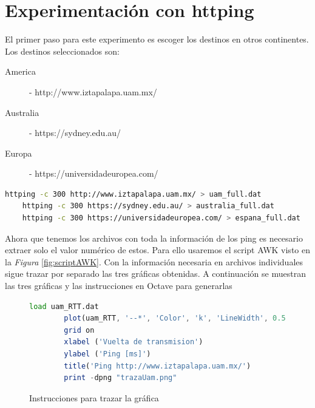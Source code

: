 \section*{Experimentación con httping}

\noindent El primer paso para este experimento es escoger los destinos en otros continentes. Los destinos seleccionados son:

\begin{description}
    \item[America] - http://www.iztapalapa.uam.mx/
	\item[Australia] - https://sydney.edu.au/
	\item[Europa] - https://universidadeuropea.com/
\end{description}

\begin{lstlisting}[language=Bash, caption=Pings con 300 muestras guardando la salida, label=lst:pings]
	httping -c 300 http://www.iztapalapa.uam.mx/ > uam_full.dat
	httping -c 300 https://sydney.edu.au/ > australia_full.dat
	httping -c 300 https://universidadeuropea.com/ > espana_full.dat
\end{lstlisting}

\noindent Ahora que tenemos los archivos con toda la informaci\'on de los ping es necesario extraer solo el valor num\'erico de estos. Para ello usaremos el script AWK visto en la \emph{Figura }\ref{fig:scriptAWK}. Con la informaci\'on necesaria en archivos individuales sigue trazar por separado las tres gr\'aficas obtenidas. A continuaci\'on se muestran las tres gr\'aficas y las instrucciones en Octave para generarlas

\newpage

\begin{figure}[H] 
    \centering 
    \begin{lstlisting}[frame=single, breaklines=true, basicstyle=\footnotesize\ttfamily, breakatwhitespace=false, columns=flexible, tabsize=2, showstringspaces=false, language=Octave] 
        load uam_RTT.dat 
        plot(uam_RTT, '--*', 'Color', 'k', 'LineWidth', 0.5, 'MarkerSize', 8) 
        grid on 
        xlabel ('Vuelta de transmision') 
        ylabel ('Ping [ms]') 
        title('Ping http://www.iztapalapa.uam.mx/') 
        print -dpng "trazaUam.png" 
    \end{lstlisting} 
    \caption{Instrucciones para trazar la gr\'afica} 
    \label{fig:uamOctave} 
\end{figure}

